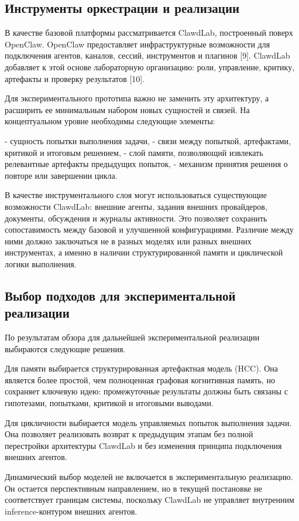 \subsection{Инструменты оркестрации и реализации}

В качестве базовой платформы рассматривается ClawdLab, построенный поверх OpenClaw. OpenClaw предоставляет инфраструктурные возможности для подключения агентов, каналов, сессий, инструментов и плагинов [9]. ClawdLab добавляет к этой основе лабораторную организацию: роли, управление, критику, артефакты и проверку результатов [10].

Для экспериментального прототипа важно не заменить эту архитектуру, а расширить ее минимальным набором новых сущностей и связей. На концептуальном уровне необходимы следующие элементы:

- сущность попытки выполнения задачи,
- связи между попыткой, артефактами, критикой и итоговым решением,
- слой памяти, позволяющий извлекать релевантные артефакты предыдущих попыток,
- механизм принятия решения о повторе или завершении цикла.

В качестве инструментального слоя могут использоваться существующие возможности ClawdLab: внешние агенты, задания внешних провайдеров, документы, обсуждения и журналы активности. Это позволяет сохранить сопоставимость между базовой и улучшенной конфигурациями. Различие между ними должно заключаться не в разных моделях или разных внешних инструментах, а именно в наличии структурированной памяти и циклической логики выполнения.

\subsection{Выбор подходов для экспериментальной реализации}

По результатам обзора для дальнейшей экспериментальной реализации выбираются следующие решения.

Для памяти выбирается структурированная артефактная модель (HCC). Она является более простой, чем полноценная графовая когнитивная память, но сохраняет ключевую идею: промежуточные результаты должны быть связаны с гипотезами, попытками, критикой и итоговыми выводами.

Для цикличности выбирается модель управляемых попыток выполнения задачи. Она позволяет реализовать возврат к предыдущим этапам без полной перестройки архитектуры ClawdLab и без изменения принципа подключения внешних агентов.

Динамический выбор моделей не включается в экспериментальную реализацию. Он остается перспективным направлением, но в текущей постановке не соответствует границам системы, поскольку ClawdLab не управляет внутренним inference-контуром внешних агентов.


